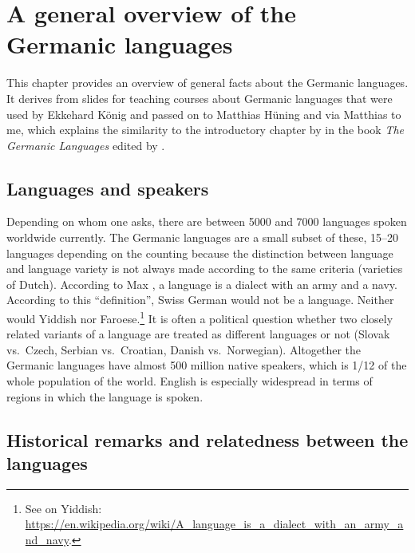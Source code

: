 \chapter{A general overview of the Germanic languages}

This chapter provides an overview of general facts about the Germanic languages. It derives from
slides for teaching courses about Germanic languages that were used by Ekkehard König and passed on
to Matthias Hüning and via Matthias to me, which explains the similarity to the introductory
chapter by \citet{HvDA94a} in the book \emph{The Germanic Languages} edited by \citet{KvdA94a-ed}.



\section{Languages and speakers}

Depending on whom one asks, there are between 5000 and 7000 languages spoken worldwide currently. The
Germanic languages are a small subset of these, 15--20 languages depending on the counting because the distinction between language and language variety is not always made according to the same criteria (\eg varieties of Dutch). 
According to Max \citet[]{Weinreich45a-u}, a language is a dialect with an army and a
navy. According to this ``definition'', Swiss German would not be a language. Neither would Yiddish
nor Faroese.\footnote{%
See \citet[]{Weinreich45a-u} on Yiddish: \url{https://en.wikipedia.org/wiki/A_language_is_a_dialect_with_an_army_and_navy}.
} 
It is often a political question whether two closely related variants of a language are treated as different languages or not (Slovak vs.\ Czech, Serbian vs.\ Croatian, Danish vs.\ Norwegian).
Altogether the Germanic languages have almost 500 million native speakers, which is 1/12 of the whole population of
the world. English is especially widespread in terms of regions in which the language is spoken.


\section{Historical remarks and relatedness between the languages}



